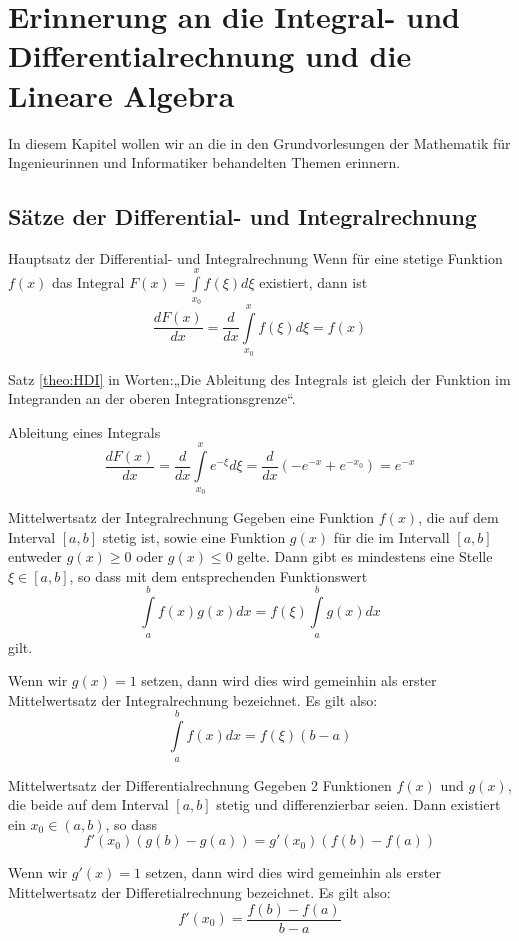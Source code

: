 \chapter[Erinnerung an die \dots]{Erinnerung an die Integral- und
Differentialrechnung und die Lineare Algebra}
In diesem Kapitel wollen wir an die in den Grundvorlesungen der Mathematik für
Ingenieurinnen und Informatiker behandelten Themen erinnern.
\section{Sätze der Differential- und Integralrechnung}
\begin{satz}{Hauptsatz der Differential- und Integralrechnung\label{theo:HSIntegralDiff}}
Wenn für eine stetige Funktion $f(x)$ das Integral
$F(x)=\int\limits_{x_0}^{x}f(\xi)d\xi$ existiert, dann ist
\[
  \frac{dF(x)}{dx}=\frac{d}{dx}\int\limits_{x_0}^{x}f(\xi)d\xi=f(x)
\]
\label{theo:HDI}
\end{satz}
Satz \ref{theo:HDI} in Worten:„Die Ableitung des Integrals ist gleich der
Funktion im Integranden an der oberen Integrationsgrenze“.
\begin{example}{Ableitung eines Integrals}
\[
 \frac{d F(x)}{dx}=\frac{d}{dx}\int\limits_{x_0}^{x}e^{-\xi}d\xi=
 \frac{d}{dx} \left(-e^{-x}+e^{-x_0}\right)=e^{-x}
\]
\end{example}
\begin{satz}{Mittelwertsatz der Integralrechnung}
  Gegeben eine Funktion $f(x)$, die auf dem Interval $[a,b]$ stetig ist, sowie
  eine Funktion $g(x)$ für die im Intervall $[a,b]$ entweder $g(x)\ge0$ oder
  $g(x)\le0$ gelte. Dann gibt es mindestens eine Stelle $\xi\in[a,b]$, so dass
  mit dem entsprechenden Funktionswert 
  \begin{equation} 
  \int\limits_a^bf(x)g(x)dx=f(\xi)\int\limits_a^bg(x)dx 
  \label{eq:MittelwertInt2} 
  \end{equation}
  gilt.   
\end{satz}
Wenn wir $g(x)=1 $ setzen, dann wird dies wird gemeinhin als erster
Mittelwertsatz der Integralrechnung bezeichnet. Es gilt also:
\begin{equation} 
  \int\limits_a^bf(x)dx=f(\xi)(b-a)
  \label{eq:MittelwertInt1}
\end{equation}
\begin{satz}{Mittelwertsatz der Differentialrechnung}
  Gegeben 2 Funktionen $f(x)$ und $g(x)$, die beide auf dem Interval $[a,b]$
  stetig und differenzierbar seien. Dann existiert ein $x_0\in(a,b)$, so dass   
  \begin{equation}
    f'(x_0)\left(g(b)-g(a)\right)= g'(x_0)\left(f(b)-f(a)\right)
  \label{eq:MittelwertDiff2}
\end{equation}
\end{satz}
Wenn wir $g'(x)=1 $ setzen, dann wird dies wird gemeinhin als erster
Mittelwertsatz der Differetialrechnung bezeichnet. Es gilt also:
\begin{equation}
  f'(x_0)=\frac{f(b)-f(a)}{b-a}
  \label{eq:MittelwertDiff1}
\end{equation}

